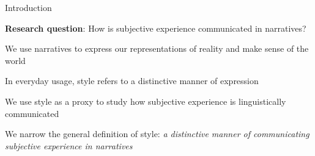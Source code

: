 \documentclass[handout,10pt]{beamer}
\begin{document}




    

\begin{frame}{Introduction}

\textbf{Research question}: How is subjective experience communicated in narratives?

\vspace{0.5cm}
\pause

We use narratives to express our representations of reality and make sense of the world %

\vspace{0.5cm}
\pause

In everyday usage, style refers to a distinctive manner of expression

\vspace{0.5cm}
\pause

We use style as a proxy to study how subjective experience is linguistically communicated

\vspace{0.5cm}
\pause

We narrow the general definition of style: \textit{a distinctive manner of communicating subjective experience in narratives}

\end{frame}
\end{document}
